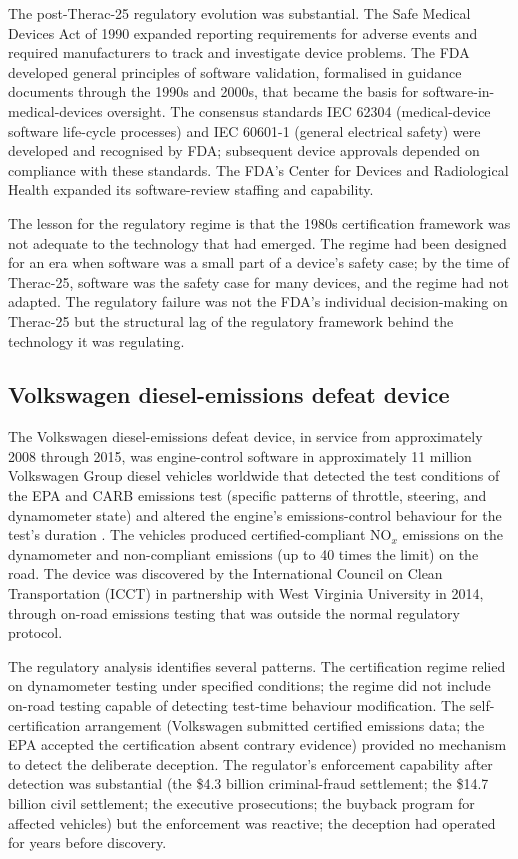The post-Therac-25 regulatory evolution was substantial. The Safe Medical Devices Act of 1990 expanded reporting requirements for adverse events and required manufacturers to track and investigate device problems. The FDA developed general principles of software validation, formalised in guidance documents through the 1990s and 2000s, that became the basis for software-in-medical-devices oversight. The consensus standards IEC 62304 (medical-device software life-cycle processes) and IEC 60601-1 (general electrical safety) were developed and recognised by FDA; subsequent device approvals depended on compliance with these standards. The FDA's Center for Devices and Radiological Health expanded its software-review staffing and capability.

The lesson for the regulatory regime is that the 1980s certification framework was not adequate to the technology that had emerged. The regime had been designed for an era when software was a small part of a device's safety case; by the time of Therac-25, software was the safety case for many devices, and the regime had not adapted. The regulatory failure was not the FDA's individual decision-making on Therac-25 but the structural lag of the regulatory framework behind the technology it was regulating.

\subsection*{Volkswagen diesel-emissions defeat device}

The Volkswagen diesel-emissions defeat device, in service from approximately 2008 through 2015, was engine-control software in approximately 11 million Volkswagen Group diesel vehicles worldwide that detected the test conditions of the EPA and CARB emissions test (specific patterns of throttle, steering, and dynamometer state) and altered the engine's emissions-control behaviour for the test's duration \cite{acc:epa-vw-nov-2015}. The vehicles produced certified-compliant NO$_x$ emissions on the dynamometer and non-compliant emissions (up to 40 times the limit) on the road. The device was discovered by the International Council on Clean Transportation (ICCT) in partnership with West Virginia University in 2014, through on-road emissions testing that was outside the normal regulatory protocol.

The regulatory analysis identifies several patterns. The certification regime relied on dynamometer testing under specified conditions; the regime did not include on-road testing capable of detecting test-time behaviour modification. The self-certification arrangement (Volkswagen submitted certified emissions data; the EPA accepted the certification absent contrary evidence) provided no mechanism to detect the deliberate deception. The regulator's enforcement capability after detection was substantial (the \$4.3 billion criminal-fraud settlement; the \$14.7 billion civil settlement; the executive prosecutions; the buyback program for affected vehicles) but the enforcement was reactive; the deception had operated for years before discovery.

